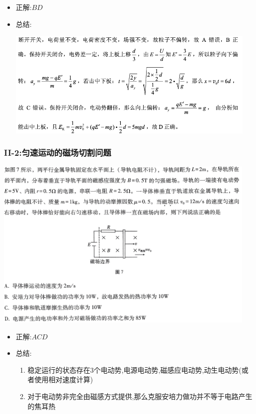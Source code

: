 \documentclass{article}
\begin{document}
\begin{itemize}
    \item 正解:\quad $BD$
    \item 总结:\quad 
    
    \includegraphics[width=0.95\textwidth,keepaspectratio]{./pictures/3.4-5.png}

\end{itemize}

\vspace{2em}

\subsubsection{II-2:匀速运动的磁场切割问题}
\includegraphics[width=0.95\textwidth,keepaspectratio]{./pictures/3.4-2.png}

\begin{itemize}
    \item 正解:\quad $ACD$
    \item 总结: \hspace{3em}\begin{enumerate}[label = (\arabic*{})]
              \item 稳定运行的状态存在$3$个电动势,电源电动势,磁感应电动势,动生电动势(或者使用相对速度计算)
              \item 对于电动势非完全由磁感方式提供,那么克服安培力做功并不等于电路产生的焦耳热
          \end{enumerate}
\end{itemize}
\end{document}
